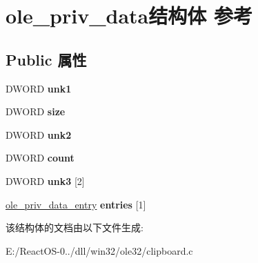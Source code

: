\hypertarget{structole__priv__data}{}\section{ole\+\_\+priv\+\_\+data结构体 参考}
\label{structole__priv__data}
\subsection*{Public 属性}
\begin{DoxyCompactItemize}
\item 
\mbox{\label{structole__priv__data_a5ae76e33ba839515004e7121ba16de23}} 
D\+W\+O\+RD {\bfseries unk1}
\item 
\mbox{\label{structole__priv__data_a8514f1594e4958bdef8d22de06f80b3b}} 
D\+W\+O\+RD {\bfseries size}
\item 
\mbox{\label{structole__priv__data_aebeb14ad7f881fbd76cea1112ef1244c}} 
D\+W\+O\+RD {\bfseries unk2}
\item 
\mbox{\label{structole__priv__data_a7570985daeca8c96d444bc0757c04ac0}} 
D\+W\+O\+RD {\bfseries count}
\item 
\mbox{\label{structole__priv__data_a84dd5f69b8009a952c416d9a75d57051}} 
D\+W\+O\+RD {\bfseries unk3} \mbox{[}2\mbox{]}
\item 
\mbox{\label{structole__priv__data_a1c70d0b81001891a664a03a194429503}} 
\hyperlink{structole__priv__data__entry}{ole\+\_\+priv\+\_\+data\+\_\+entry} {\bfseries entries} \mbox{[}1\mbox{]}
\end{DoxyCompactItemize}


该结构体的文档由以下文件生成\+:\begin{DoxyCompactItemize}
\item 
E\+:/\+React\+O\+S-\/0../dll/win32/ole32/clipboard.\+c\end{DoxyCompactItemize}
